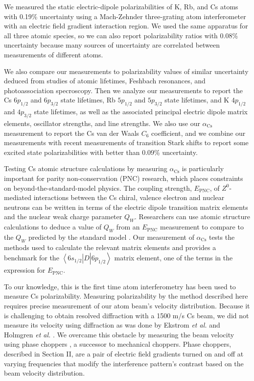 \documentclass[twocolumn,prl,showpacs,superscriptaddress]{revtex4-1}   %
\newcommand{\brakett}[3]{\left\langle #1 \right|#2\left| #3 \right\rangle}
\newcommand{\acs}{\alpha_{\textrm{Cs}}}
\newcommand{\etalspace}{\textit{et al. }}
\begin{document}
We measured the static electric-dipole polarizabilities of K, Rb, and Cs atoms with 0.19\% uncertainty using a Mach-Zehnder three-grating atom interferometer \cite{Berman1997,Cronin2009} with an electric field gradient interaction region. We used the same apparatus for all three atomic species, so we can also report polarizability ratios with 0.08\% uncertainty because many sources of uncertainty are correlated between measurements of different atoms. 

We also compare our measurements to polarizability values of similar uncertainty deduced from studies of atomic lifetimes, Feshbach resonances, and photoassociation specroscopy. Then we analyze our measurements to report the Cs $6p_{1/2}$ and $6p_{3/2}$ state lifetimes, Rb $5p_{1/2}$ and $5p_{3/2}$ state lifetimes, and K $4p_{1/2}$ and $4p_{3/2}$ state lifetimes, as well as the associated principal electric dipole matrix elements, oscillator strengths, and line strengths. 
We also use our $\acs$ measurement to report the Cs van der Waals $C_6$ coefficient,
and we combine our measurements with recent measurements of 
transition Stark shifts to report some excited state polarizabilities with better than 0.09\% uncertainty.

Testing Cs atomic structure calculations by measuring $\acs$ is particularly important for parity non-conservation (PNC) research, which places constraints on beyond-the-standard-model physics. The coupling strength, $E_{\mathrm{PNC}}$, of $Z^0$-mediated interactions between the Cs chiral, valence electron and nuclear neutrons can be written in terms of the electric dipole transition matrix elements and the nuclear weak charge parameter $Q_W$. Researchers can use atomic structure calculations to deduce a value of $Q_W$ from an $E_{\mathrm{PNC}}$ measurement \cite{Cho1997} to compare to the $Q_W$ predicted by the standard model \cite{Bouchiat1999,Dzuba2012}. Our measurement of $\acs$ tests the methods used to calculate the relevant matrix elements and provides a benchmark for the $\brakett{6s_{1/2}}{\hat{D}}{6p_{1/2}}$ matrix element, one of the terms in the expression for $E_{\mathrm{PNC}}$.

To our knowledge, this is the first time atom interferometry has been used to measure Cs polarizability. Measuring polarizability by the method described here requires precise measurement of our atom beam's velocity distribution. Because it is challenging to obtain resolved diffraction with a 1500 m/s Cs beam, we did not measure its velocity using diffraction as was done by Ekstrom \etalspace and Holmgren \etalspace \cite{Ekstrom1995,Holmgren2010}. We overcame this obstacle by measuring the beam velocity using phase choppers \cite{Roberts2002,Roberts2004,Holmgren2011,Hromada2014}, a successor to mechanical choppers.
Phase choppers, described in Section II, are a pair of electric field gradients turned on and off at varying frequencies that modify the interference pattern's contrast based on the beam velocity distribution. 
\end{document}
